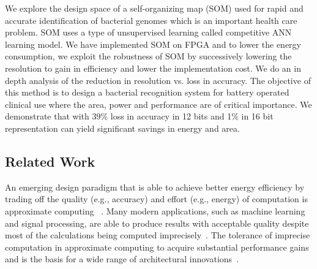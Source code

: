 \documentclass[a4paper,10pt]{article}
\begin{document}
We explore the design space of a self-organizing map (SOM) used for rapid and accurate identification of bacterial genomes which is an important health care problem.  SOM uses a type of unsupervised learning called competitive ANN learning model. We have implemented SOM on FPGA and to lower the energy consumption, we exploit the robustness of SOM by successively lowering the resolution to gain in efficiency and lower the implementation cost. We do an in depth analysis of the reduction in resolution vs. loss in accuracy. The objective of this method is to design a bacterial recognition system for battery operated clinical use where the area, power and performance are of critical importance. We demonstrate that with 39\% loss in accuracy in 12 bits and 1\% in 16 bit representation can yield significant savings in energy and area.


\subsection{Related Work}
 An emerging design paradigm that is able to achieve better energy efficiency by trading off the quality (e.g., accuracy) and effort (e.g., energy) of computation is approximate computing ~\cite{Zhang2014}. Many modern applications, such as machine learning and signal processing, are able to produce results with acceptable quality despite most of the calculations being computed imprecisely~\cite{Ye2013}. The tolerance of imprecise computation in approximate computing  to acquire substantial performance gains and is the basis for a wide range of architectural innovations~\cite{Esmaeilzadeh2012}.
\end{document}
